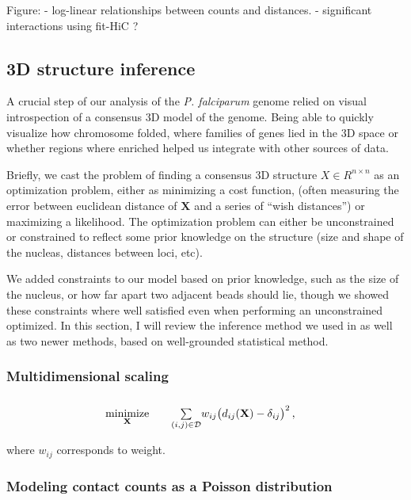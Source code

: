 \documentclass[oupdraft]{bio}
\begin{document}
Figure:
  - log-linear relationships between counts and distances.
  - significant interactions using fit-HiC ?

\subsection{3D structure inference}

A crucial step of our analysis of the \textit{P. falciparum} genome relied on
visual introspection of a consensus 3D model of the genome. Being able to
quickly visualize how chromosome folded, where families of genes lied in the
3D space or whether regions where enriched helped us integrate with other
sources of data.

Briefly, we cast the problem of finding a consensus 3D structure $X \in R^{n
\times n}$ as an optimization problem, either as minimizing a cost function,
(often measuring the error between euclidean distance of $\mathbf{X}$ and a
series of ``wish distances'') or maximizing a likelihood. The optimization
problem can either be unconstrained or constrained to reflect some prior
knowledge on the structure (size and shape of the nucleas, distances between
loci, etc).

 We added constraints to our model based on prior knowledge,
such as the size of the nucleus, or how far apart two adjacent beads should
lie, though we showed these constraints where well satisfied even when
performing an unconstrained optimized. In this section, I will review the
inference method we used in \citet{ay:three-dimensional} as well as two newer
methods, based on well-grounded statistical method.

\subsubsection{Multidimensional scaling}

\begin{equation}\label{eq:mds1} 
\renewcommand{\arraystretch}{2} 
\begin{array}{ccll} 
\underset{\mathbf{X}}{\text{minimize}} & & 
\underset{(i,j) \in \mathcal{D}}{\sum} w_{ij} \big(d_{ij}(\mathbf{X}) - \delta_{ij}\big)^2
\,,&\\ 
\end{array} 
\end{equation}

where $w_{ij}$ corresponds to weight.


\subsubsection{Modeling contact counts as a Poisson distribution}
\end{document}
